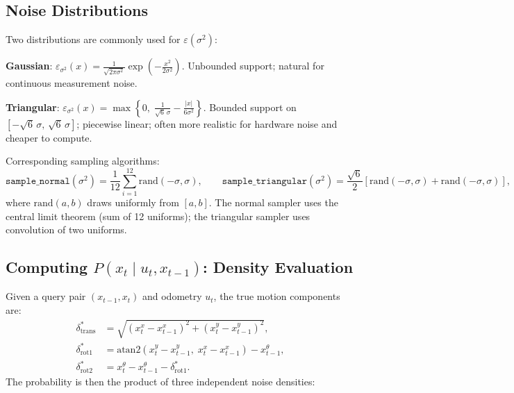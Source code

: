 \documentclass[11pt,a4paper]{article}
\theoremstyle{definition}
\theoremstyle{plain}
\theoremstyle{remark}
\begin{document}
\subsection{Noise Distributions}

Two distributions are commonly used for $\varepsilon(\sigma^2)$:

\textbf{Gaussian}: $\varepsilon_{\sigma^2}(x) = \frac{1}{\sqrt{2\pi\sigma^2}}\exp\!\left(-\frac{x^2}{2\sigma^2}\right)$. Unbounded support; natural for continuous measurement noise.

\textbf{Triangular}: $\varepsilon_{\sigma^2}(x) = \max\!\left\{0,\; \frac{1}{\sqrt{6}\,\sigma} - \frac{|x|}{6\sigma^2}\right\}$. Bounded support on $[-\sqrt{6}\,\sigma,\, \sqrt{6}\,\sigma]$; piecewise linear; often more realistic for hardware noise and cheaper to compute.

Corresponding sampling algorithms:
\[
    \texttt{sample\_normal}(\sigma^2) = \frac{1}{12}\sum_{i=1}^{12}\mathrm{rand}(-\sigma, \sigma),
    \qquad
    \texttt{sample\_triangular}(\sigma^2) = \frac{\sqrt{6}}{2}\!\left[\mathrm{rand}(-\sigma,\sigma) + \mathrm{rand}(-\sigma,\sigma)\right],
\]
where $\mathrm{rand}(a,b)$ draws uniformly from $[a,b]$. The normal sampler uses the central limit theorem (sum of 12 uniforms); the triangular sampler uses convolution of two uniforms.

\subsection{Computing $P(x_t \mid u_t, x_{t-1})$: Density Evaluation}

Given a query pair $(x_{t-1}, x_t)$ and odometry $u_t$, the true motion components are:
\begin{align*}
    \delta_{\mathrm{trans}}^* &= \sqrt{(x_t^x - x_{t-1}^x)^2 + (x_t^y - x_{t-1}^y)^2}, \\ %
    \delta_{\mathrm{rot1}}^*  &= \mathrm{atan2}(x_t^y - x_{t-1}^y,\; x_t^x - x_{t-1}^x) - x_{t-1}^\theta, \\
    \delta_{\mathrm{rot2}}^*  &= x_t^\theta - x_{t-1}^\theta - \delta_{\mathrm{rot1}}^*.
\end{align*}
The probability is then the product of three independent noise densities:
\end{document}
